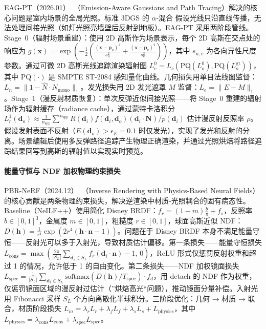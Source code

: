 EAG-PT（2026.01）~\cite{2601_23065}（Emission-Aware Gaussians and Path Tracing）解决的核心问题是室内场景的全局光照。标准 3DGS 的 $\alpha$-混合 假设光线只沿直线传播，无法处理间接光照（如灯光照亮墙壁后反射到地板）。EAG-PT 采用两阶段管线。Stage~0（辐射场景重建）：使用 2D 高斯作为场景表示，每个 2D 高斯在交点处的响应为 $g(\mathbf{x}) = \exp\left(-\frac{1}{2}\left(\frac{(\mathbf{x}-\mathbf{p}_u)^2}{s_u^2} + \frac{(\mathbf{x}-\mathbf{p}_v)^2}{s_v^2}\right)\right)$，其中 $s_{u,v}$ 为各向异性尺度参数。通过可微 2D 高斯光线追踪渲染辐射图 $L_c^0 = L_c(\text{PQ}(L_o^0), \text{PQ}(L_o^{\text{gt}}))$，其中 $\text{PQ}(\cdot)$ 是 SMPTE ST-2084 感知量化曲线。几何损失用单目法线图监督：$L_n = \|1 - \hat{N} \cdot N_{\text{mono}}\|_1$。发光损失用 2D 发光遮罩 $M$ 监督：$L_e = \|E - M\|_1$。Stage~1（漫反射材质恢复）：单次反弹近似间接光照——将 Stage~0 重建的辐射场作为辐射缓存（radiance cache），通过蒙特卡洛积分 $L_r^1(\mathbf{d}_o) \approx \frac{1}{n_{\text{spp}}} \sum^{n_{\text{spp}}} R(\mathbf{d}_i) f(\mathbf{d}_i, \mathbf{d}_o) (\mathbf{d}_i \cdot \mathbf{N}) / p(\mathbf{d}_i)$ 估计漫反射反照率 $\rho$。假设发射表面不反射（$E(\mathbf{d}_o) > \epsilon_E=0.1$ 时仅发光），实现了发光和反射的分离。场景编辑后使用多反弹路径追踪产生物理正确渲染，并通过光照烘焙将路径追踪结果回写到高斯的辐射值以实现实时预览。

\paragraph{能量守恒与 NDF 加权物理约束损失}

PBR-NeRF（2024.12）~\cite{2412_09680}（Inverse Rendering with Physics-Based Neural Fields）的核心贡献是两条物理约束损失，解决逆渲染中材质-光照耦合的固有病态性。Baseline（NeILF++）使用简化 Disney BRDF：$f_r = (1-m)\frac{b}{\pi} + f_s$，反照率 $b \in [0,1]^3$，金属度 $m \in [0,1]$，粗糙度 $r \in [0,1]$，球面高斯近似 NDF：$D(\mathbf{h}) = \frac{1}{r^4} \exp(2r^4(\mathbf{h} \cdot \mathbf{n} - 1))$。问题在于 Disney BRDF 本身不满足能量守恒——反射光可以多于入射光，导致材质估计偏移。第一条损失——能量守恒损失 $L_{\text{cons}} = \max\left(\frac{2\pi}{|S_L|}\sum_{\mathbf{d}_i \in S_L} f_r (\mathbf{d}_i \cdot \mathbf{n}) - 1, \, 0\right)$，ReLU 形式仅惩罚反射权重和超过 1 的情况，允许低于 1 的自由变化。第二条损失——NDF 加权镜面损失 $L_{\text{spec}} = \frac{1}{|S_L|}\sum_{\mathbf{d}_i \in S_L} \text{softmax}(D(\mathbf{h})/T_{\text{spec}}) \cdot f_d$，用 detach 的 NDF 作为权重，仅惩罚镜面区域的漫反射过估计（”烘焙高光“问题），推动镜面分量补偿。入射光用 Fibonacci 采样 $S_L$ 个方向离散化半球积分。三阶段优化：几何 → 材质 → 联合，材质阶段损失 $L_m = \lambda_r L_r + \lambda_f L_f + \lambda_s L_s + L_{\text{physics}}$，其中 $L_{\text{physics}} = \lambda_{\text{cons}} L_{\text{cons}} + \lambda_{\text{spec}} L_{\text{spec}}$。

